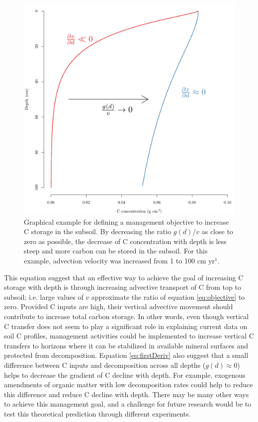 \documentclass[11pt, oneside, a4paper]{article}   	%
\begin{document}
\begin{figure}[htbp]
   \centering
   \includegraphics[width=\textwidth]{Figures/managementObjective.pdf} %
   \caption{Graphical example for defining a management objective to increase C storage in the subsoil. By decreasing the ratio $g(d)/v$ as close to zero as possible, the decrease of C concentration with depth is less steep and more carbon can be stored in the subsoil. For this example, advection velocity was increased from 1 to 100 cm yr$^{1}$.}
   \label{fig:managementObjective}
\end{figure}

This equation suggest that an effective way to achieve the goal of increasing C storage with depth is through increasing advective transport of C from top to subsoil; i.e. large values of $v$ approximate the ratio of equation \ref{eq:objective} to zero. Provided C inputs are high, their vertical advective movement should contribute to increase total carbon storage. In other words, even though vertical C transfer does not seem to play a significant role in explaining current data on soil C profiles, management activities could be implemented to increase vertical C transfers to horizons where it can be stabilized in available mineral surfaces \citep{Georgiou2022} and protected from decomposition. Equation \ref{eq:firstDeriv} also suggest that a small difference between C inputs and decomposition across all depths ($g(d) \approx 0$) helps to decrease the gradient of C decline with depth. For example, exogenous amendments of organic matter with low decomposition rates could help to reduce this difference and reduce C decline with depth. There may be many other ways to achieve this management goal, and a challenge for future research would be to test this theoretical prediction through different experiments.
\end{document}
